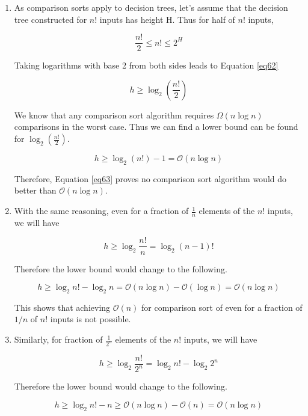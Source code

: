 \begin{enumerate}[label=(\alph*)]
\item As comparison sorts apply to decision trees, let's assume that the decision tree constructed for $n!$ inputs has height H.
Thus for half of $n!$ inputs,

\begin{equation}\label{eq61}
\frac{n!}{2} \leq n! \leq 2^H
\end{equation}

Taking logarithms with base 2 from both sides leads to Equation \ref{eq62}

\begin{equation}\label{eq62}
h \geq \log_2 (\frac{n!}{2})
\end{equation}

We know that any comparison sort algorithm requires $\Omega(n \log n)$ comparisons in the worst case.
Thus we can find a lower bound can be found for $\log_2(\frac{n!}{2})$.

\begin{equation}\label{eq63}
h \geq \log_2 (n!) - 1 = \mathcal{O}(n \log n)
\end{equation}

Therefore, Equation \ref{eq63} proves no comparison sort algorithm would do better than $\mathcal{O}(n\log n)$.

\item With the same reasoning, even for a fraction of $\frac{1}{n}$ elements of the $n!$ inputs, we will have

\begin{equation}\label{eq64}
h \geq \log_2 \frac{n!}{n} = \log_2 {(n-1)!}
\end{equation}

Therefore the lower bound would change to the following.

\begin{equation}\label{eq65}
h \geq \log_2 n! - \log_2 n = \mathcal{O}(n \log n) - \mathcal{O}(\log n) = \mathcal{O}(n \log n)
\end{equation}

This shows that achieving $\mathcal{O}(n)$ for comparison sort of  even for a fraction of $1/n$ of $n!$ inputs is not possible.

\item Similarly, for fraction of $\frac{1}{2^{n}}$ elements of the $n!$ inputs, we will have

\begin{equation}\label{eq66}
h \geq \log_2 \frac{n!}{2^{n}} = \log_2 {n!} - \log_2 {2^{n}}
\end{equation}

Therefore the lower bound would change to the following.

\begin{equation}\label{eq67}
h \geq \log_2 {n!} - n \geq \mathcal{O}(n \log n) - \mathcal{O}(n) = \mathcal{O}(n \log n)
\end{equation}

\end{enumerate}



